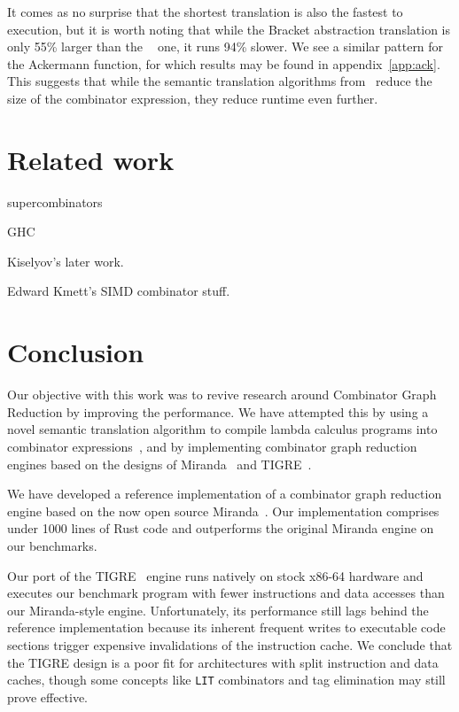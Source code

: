 \documentclass[conference]{IEEEtran}
\DeclareMathOperator{\lazyeta}{lazy_\eta}
\begin{document}
It comes as no surprise that the shortest translation is also the fastest to execution, but it is worth noting that while the Bracket abstraction translation is only 55\% larger than the $\lazyeta$ one, it runs 94\% slower.
We see a similar pattern for the Ackermann function, for which results may be found in appendix~\ref{app:ack}.
This suggests that while the semantic translation algorithms from~\cite{kiselyov_lambda_2018} reduce the size of the combinator expression, they reduce runtime even further.

\section{Related work}
supercombinators

GHC

Kiselyov's later work.

Edward Kmett's SIMD combinator stuff.

\section{Conclusion}
Our objective with this work was to revive research around Combinator Graph Reduction by improving the performance.
We have attempted this by using a novel semantic translation algorithm to compile lambda calculus programs into combinator expressions~\cite{kiselyov_lambda_2018}, and by implementing combinator graph reduction engines based on the designs of Miranda~\cite{turner_new_1979} and TIGRE~\cite{koopman_fresh_1989}.

We have developed a reference implementation of a combinator graph reduction engine based on the now open source Miranda~\cite{turner_new_1979}.
Our implementation comprises under 1000 lines of Rust code and outperforms the original Miranda engine on our benchmarks.

Our port of the TIGRE~\cite{koopman_fresh_1989} engine runs natively on stock x86-64 hardware and executes our benchmark program with fewer instructions and data accesses than our Miranda-style engine.
Unfortunately, its performance still lags behind the reference implementation because its inherent frequent writes to executable code sections trigger expensive invalidations of the instruction cache.
We conclude that the TIGRE design is a poor fit for architectures with split instruction and data caches, though some concepts like \texttt{LIT} combinators and tag elimination may still prove effective.
\end{document}

